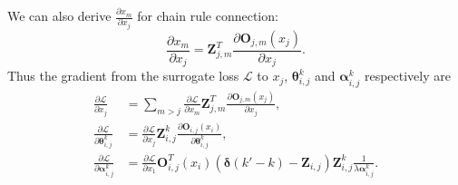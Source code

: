 \documentclass{article} \usepackage{iclr2019_conference,times}
\begin{document}
We can also derive $\frac{\partial x_{m}}{\partial x_{j}}$ for chain rule connection:
\begin{equation}
\frac{\partial x_{m}}{\partial x_{j}} = \bm{Z}_{j,m}^{T} \frac{\partial \bm{O}_{j,m}(x_{j})}{\partial x_{j}}.
\end{equation}
Thus the gradient from the surrogate loss $\mathcal{L}$ to $x_{j}$, $\bm{\theta}_{i,j}^{k}$ and $\bm{\alpha}_{i,j}^{k}$ respectively are
\begin{equation}
\begin{split}
\frac{\partial \mathcal{L}}{\partial x_{j}} &= \sum_{m>j}\frac{\partial \mathcal{L}}{\partial x_{m}}\bm{Z}_{j,m}^{T} \frac{\partial \bm{O}_{j, m}(x_{j})}{\partial x_{j}}, \\
\frac{\partial \mathcal{L}}{\partial \bm{\theta}_{i,j}^{k}} &= \frac{\partial \mathcal{L}}{\partial x_{j}}\bm{Z}_{i,j}^{k} \frac{\partial \bm{O}_{i,j}(x_{i})}{\partial \bm{\theta}_{i,j}^{k}}, \\
\frac{\partial \mathcal{L}}{\partial \bm{\alpha}_{i,j}^{k}} &= \frac{\partial \mathcal{L}}{\partial x_{1}}\bm{O}_{i,j}^{T}(x_{i}) (\bm{\delta}(k'-k)-\bm{Z}_{i,j})\bm{Z}_{i,j}^{k}\frac{1}{\lambda\bm{\alpha}_{i,j}^{k}}.
\end{split}
\end{equation}
\end{document}
